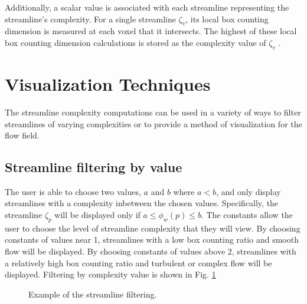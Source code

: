 \documentclass[journal]{vgtc}                %
\begin{document}
Additionally, a scalar value is associated with each streamline representing the streamline's complexity.
For a single streamline $\zeta_v$, its local box counting dimension is measured at each voxel that it intersects.
The highest of these local box counting dimension calculations is stored as the complexity value of $\zeta_v$ .

\section{Visualization Techniques} \label{sec:vt}

The streamline complexity computations can be used in a variety of ways to filter streamlines of varying complexities or to provide a method of visualization for the flow field.

\subsection{Streamline filtering by value}
The user is able to choose two values, $a$ and $b$ where $a < b$, and only display streamlines with a complexity inbetween the chosen values. 
Specifically, the streamline $\zeta_p$ will be displayed only if $a \leq \phi_w(p) \leq b$.
The constants allow the user to choose the level of streamline complexity that they will view.
By choosing constants of values near 1, streamlines with a low box counting ratio and smooth flow will be displayed.
By choosing constants of values above 2, streamlines with a relatively high box counting ratio and turbulent or complex flow will be displayed.
Filtering by complexity value is shown in Fig. \ref{fig:value_filter}

\begin{figure}[t]
	\centering
		\begin{minipage}{0.45\linewidth}
			\centering \small
		\end{minipage}
		\begin{minipage}{0.45\linewidth}
			\centering \small
		\end{minipage}
	\caption{Example of the streamline filtering.}
	\label{fig:value_filter}
\end{figure}
\end{document}
